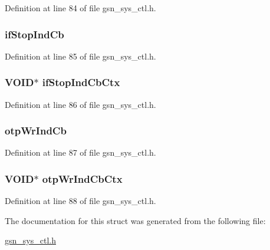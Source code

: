 Definition at line 84 of file gsn\_\-sys\_\-ctl.h.

\hypertarget{a00253_a417d43ab7533336c4d668c9f901ebab7}{
\subsubsection[{ifStopIndCb}]{ {\bf ifStopIndCb}}}
\label{a00253_a417d43ab7533336c4d668c9f901ebab7}


Definition at line 85 of file gsn\_\-sys\_\-ctl.h.

\hypertarget{a00253_a5f78cc4f4b77ce241da7d95089ca5ccc}{
\subsubsection[{ifStopIndCbCtx}]{\setlength{\rightskip}{0pt plus 5cm}VOID$\ast$ {\bf ifStopIndCbCtx}}}
\label{a00253_a5f78cc4f4b77ce241da7d95089ca5ccc}


Definition at line 86 of file gsn\_\-sys\_\-ctl.h.

\hypertarget{a00253_ac4e9475942d5fa1daee8818d9be41b48}{
\subsubsection[{otpWrIndCb}]{ {\bf otpWrIndCb}}}
\label{a00253_ac4e9475942d5fa1daee8818d9be41b48}


Definition at line 87 of file gsn\_\-sys\_\-ctl.h.

\hypertarget{a00253_a20176e92687bbf50f917b1abb61aa486}{
\subsubsection[{otpWrIndCbCtx}]{\setlength{\rightskip}{0pt plus 5cm}VOID$\ast$ {\bf otpWrIndCbCtx}}}
\label{a00253_a20176e92687bbf50f917b1abb61aa486}


Definition at line 88 of file gsn\_\-sys\_\-ctl.h.



The documentation for this struct was generated from the following file:\begin{DoxyCompactItemize}
\item 
\hyperlink{a00592}{gsn\_\-sys\_\-ctl.h}\end{DoxyCompactItemize}
